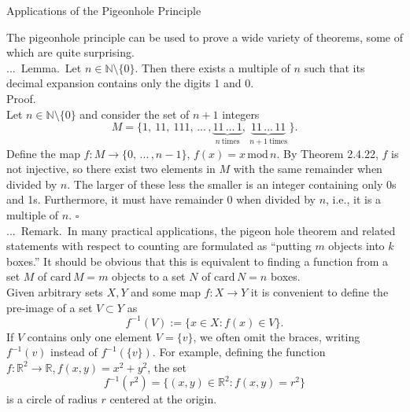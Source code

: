 \documentclass[smaller,hyperref={CJKbookmarks=true}]{beamer}
\newcommand{\N}{\mathbb{N}} \newcommand{\Z}{\mathbb{Z}} \newcommand{\Q}{\mathbb{Q}}
\newcommand{\R}{\mathbb{R}}
\newenvironment{PROOF}{{\noindent\!\sf\alert{Proof.}}\\}{\hfill$\square$\\}
\newcounter{zhuo}[subsection]
\renewcommand{\thezhuo}{\thesection.\thesubsection.\arabic{zhuo}}
\newenvironment{REMARK}{\stepcounter{zhuo}\alert{\thezhuo.~Remark.\,}}{}
\newenvironment{LEMMA}{\stepcounter{zhuo}\alert{\thezhuo.~Lemma.\,}}{}
\begin{document}
\begin{frame}{Applications of the Pigeonhole Principle}
\begin{spacing}{1.05}
The pigeonhole principle can be used to prove a wide variety of theorems,
some of which are quite surprising.\\[5pt]
\begin{LEMMA}
Let $n\in\N\setminus\{0\}$. Then there exists a multiple of $n$ such that its decimal expansion contains only the digits 1 and 0.\\[5pt]
\end{LEMMA}
\begin{PROOF}
Let $n\in\N\setminus\{0\}$ and consider the set of $n+1$ integers
\[M=\{1,~11,~111,\,...\,,\underbrace{11\,...\,1}_{n~\text{times}},
~\underbrace{11\,...\,11}_{n+1~\text{times}}\,\}.\]
Define the map $f:M\to\{0,\,...\,,n-1\},\,f(x)=x\,\text{mod}\,n$. By Theorem 2.4.22, $f$ is not injective, so there exist two elements in $M$ with the same remainder when divided by $n$. The larger of these less the smaller is an integer containing only 0s and 1s. Furthermore, it must have remainder 0 when divided by $n$, i.e., it is a multiple of $n$.
\end{PROOF}
\newpage
\begin{REMARK}
In many practical applications, the pigeon hole theorem
and related statements with respect to counting are formulated as
``putting $m$ objects into $k$ boxes.'' It should be obvious that this is
equivalent to finding a function from a set $M$ of $\text{card}\,M=m$ objects to a set $N$ of $\text{card}\,N=n$ boxes.\\[5pt]
Given arbitrary sets $X,Y$ and some map $f:X\to Y$ it is convenient to define the pre-image of a set $V\subset Y$ as
\[f^{-1}(V):=\{x\in X:f(x)\in V\}.\]
If $V$ contains only one element $V=\{v\}$, we often omit the braces, writing $f^{-1}(v)$ instead of $f^{-1}(\{v\})$. For example, defining the function $f:\R^2\to\R,f(x,y)=x^2+y^2$, the set
\[f^{-1}(r^2)=\{(x,y)\in\R^2:f(x,y)=r^2\}\]
is a circle of radius $r$ centered at the origin.
\end{REMARK}
\end{spacing}
\end{frame}
\end{document}
